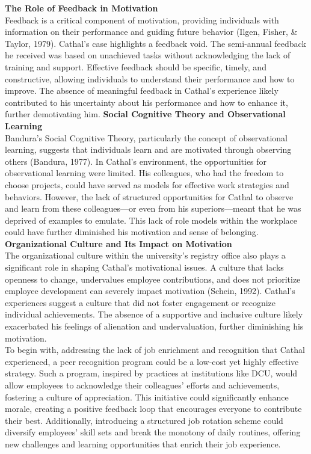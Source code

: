 \documentclass[12pt]{article}
\begin{document}
\begin{flushleft}
\bigbreak \noindent 
\textbf{The Role of Feedback in Motivation} \\
Feedback is a critical component of motivation, providing individuals with information on their performance and guiding future behavior (Ilgen, Fisher, & Taylor, 1979). Cathal's case highlights a feedback void. The semi-annual feedback he received was based on unachieved tasks without acknowledging the lack of training and support. Effective feedback should be specific, timely, and constructive, allowing individuals to understand their performance and how to improve. The absence of meaningful feedback in Cathal's experience likely contributed to his uncertainty about his performance and how to enhance it, further demotivating him.
\bigbreak \noindent 
\textbf{Social Cognitive Theory and Observational Learning} \\
Bandura's Social Cognitive Theory, particularly the concept of observational learning, suggests that individuals learn and are motivated through observing others (Bandura, 1977). In Cathal's environment, the opportunities for observational learning were limited. His colleagues, who had the freedom to choose projects, could have served as models for effective work strategies and behaviors. However, the lack of structured opportunities for Cathal to observe and learn from these colleagues—or even from his superiors—meant that he was deprived of examples to emulate. This lack of role models within the workplace could have further diminished his motivation and sense of belonging.
\bigbreak \noindent 
\textbf{Organizational Culture and Its Impact on Motivation} \\
The organizational culture within the university's registry office also plays a significant role in shaping Cathal's motivational issues. A culture that lacks openness to change, undervalues employee contributions, and does not prioritize employee development can severely impact motivation (Schein, 1992). Cathal's experiences suggest a culture that did not foster engagement or recognize individual achievements. The absence of a supportive and inclusive culture likely exacerbated his feelings of alienation and undervaluation, further diminishing his motivation. \\
To begin with, addressing the lack of job enrichment and recognition that Cathal experienced, a peer recognition program could be a low-cost yet highly effective strategy. Such a program, inspired by practices at institutions like DCU, would allow employees to acknowledge their colleagues' efforts and achievements, fostering a culture of appreciation. This initiative could significantly enhance morale, creating a positive feedback loop that encourages everyone to contribute their best. Additionally, introducing a structured job rotation scheme could diversify employees' skill sets and break the monotony of daily routines, offering new challenges and learning opportunities that enrich their job experience. \

\end{flushleft}
\end{document}
